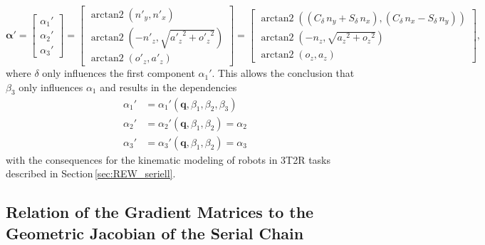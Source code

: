 \documentclass[robotics,article,accept,moreauthors,pdftex]{Definitions/mdpi}
\newcommand{\bm}[1]{\boldsymbol{#1}}
\DeclareMathOperator{\arctantwo}{arctan2}
\begin{document}
\begin{equation}
\bm{\alpha}'
=
\begin{bmatrix}
\alpha_1' \\
\alpha_2' \\
\alpha_3'
\end{bmatrix}
=
\begin{bmatrix}
\arctantwo \left( {n'_y} , { n'_x} \right) \\ 
\arctantwo \left( -{n'_z} , \sqrt {{{a'_z}}^{2}+{{ o'_z}}^{2}} \right) \\ 
\arctantwo \left( {o'_z} , {a'_z} \right)
\end{bmatrix}
=
\begin{bmatrix}
\arctantwo \left( ({ C_{\delta}}\,{n_y}+{ S_{\delta}}\,{n_x}) , ({ C_{\delta}}\,{n_x}-{ S_{\delta}}\,{n_y}) \right) \\
\arctantwo \left( -{n_z} , \sqrt {{{a_z}}^{2}+{{ o_z}}^{2}} \right) \\
\arctantwo \left( {o_z} , {a_z} \right)
\end{bmatrix},
\end{equation}
%
where $\delta$ only influences the first component $\alpha_1'$.
This allows the conclusion that $\beta_3$ only influences $\alpha_1$ and results in the dependencies
%
\begin{align}
    \alpha_1'&=\alpha_1'(\bm{q},\beta_1,\beta_2,\beta_3)\\
    \alpha_2'&=\alpha_2'(\bm{q},\beta_1,\beta_2) =\alpha_2\\
    \alpha_3'&=\alpha_3'(\bm{q},\beta_1,\beta_2) =\alpha_3
\end{align}
%
with the consequences for the kinematic modeling of robots in 3T2R tasks described in Section\,\ref{sec:REW_seriell}.

\subsection{Relation of the Gradient Matrices to the Geometric Jacobian of the Serial Chain}
\label{sec:appendix_gradient_geomjacobian}

\end{document}
